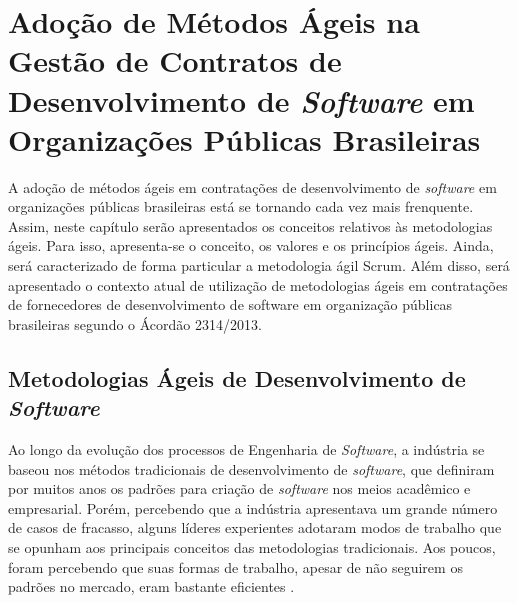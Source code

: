 

\chapter[Adoção de Métodos Ágeis na Gestão de Contratos de Desenvolvimento de \textit{Software} em Organizações Públicas Brasileiras]{Adoção de Métodos Ágeis na Gestão de Contratos de Desenvolvimento de \textit{Software} em Organizações Públicas Brasileiras}

A adoção de métodos ágeis em contratações de desenvolvimento de \textit{software} em organizações públicas brasileiras está se tornando cada vez mais frenquente. Assim,  neste capítulo serão apresentados os conceitos relativos às metodologias ágeis. Para isso, apresenta-se o conceito, os valores e os princípios ágeis. Ainda, será caracterizado de forma particular a metodologia ágil Scrum. Além disso, será apresentado o contexto atual de utilização de metodologias ágeis em contratações de fornecedores de desenvolvimento de software em organização públicas brasileiras segundo o Ácordão 2314/2013.

\section[Metodologias Ágeis de Desenvolvimento de \textit{Software}]{Metodologias Ágeis de Desenvolvimento de \textit{Software}}

Ao longo da evolução dos processos de Engenharia de \textit{Software}, a indústria se baseou nos métodos tradicionais de desenvolvimento de \textit{software}, que definiram por muitos anos os padrões para criação de \textit{software} nos meios acadêmico e empresarial. Porém, percebendo que a indústria apresentava um grande número de casos de fracasso, alguns líderes experientes adotaram modos de trabalho que se opunham aos principais conceitos das metodologias tradicionais. Aos poucos, foram percebendo que suas formas de trabalho, apesar de não seguirem os padrões no mercado, eram bastante eficientes   \cite{filho}. 

